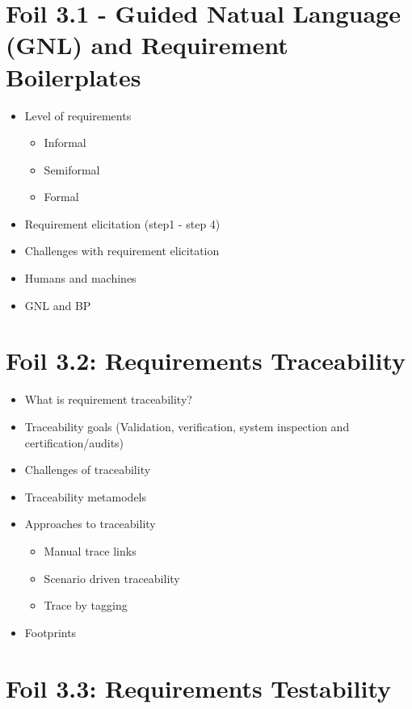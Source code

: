 	
	\section{Foil 3.1 - Guided Natual Language (GNL) and Requirement Boilerplates }
		\begin{itemize}
			\item Level of requirements
				\begin{itemize}
					\item Informal
					\item Semiformal
					\item Formal
				\end{itemize}
			\item Requirement elicitation (step1 - step 4)
			\item Challenges with requirement elicitation
			\item Humans and machines
			\item GNL and BP
		\end{itemize}


	\section{Foil 3.2: Requirements Traceability}
		\begin{itemize}
			\item What is requirement traceability?
			\item Traceability goals (Validation, verification, system inspection and certification/audits)
			\item Challenges of traceability
			\item Traceability metamodels
			\item Approaches to traceability
				\begin{itemize}
					\item Manual trace links
					\item Scenario driven traceability	
					\item Trace by tagging
				\end{itemize}
			\item Footprints	
		\end{itemize}

	\section{Foil 3.3: Requirements Testability}

